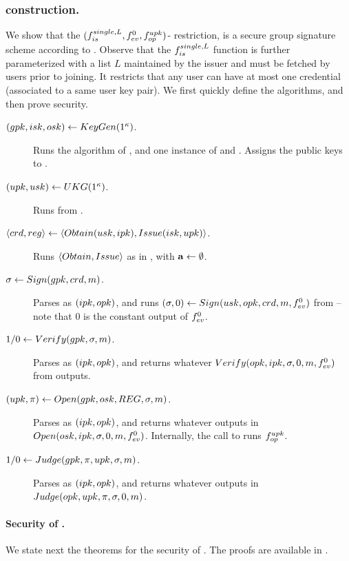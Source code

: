 \subsubsection{\CUASGS construction.} %
We show that the $(f_{is}^{single,L},f_{ev}^0,f_{op}^{upk})$-\CUASGen
restriction, is a secure group signature scheme according to \cite{bsz05}.
Observe that the $f_{is}^{single,L}$ function is further parameterized with
a list $L$ maintained by the issuer and must be fetched by users prior to
joining. It restricts that any user can have at most one credential (associated
to a same user key pair). We first quickly define the algorithms, and then
prove security.

\begin{description}
\item[$(gpk,isk,osk) \gets KeyGen(1^\kappa)$.] Runs the \Setup algorithm
  of \CUASGen, and one instance of \IKeyGen and \OKeyGen. Assigns the public
  keys to \gpk.
\item[$(upk,usk) \gets UKG(1^\kappa)$.] Runs \UKeyGen from \CUASGen.
\item[$\langle crd,reg \rangle \gets
  \langle Obtain(usk,ipk),Issue(isk,upk)\rangle$.] Runs $\langle Obtain,
  Issue\rangle$ as in \CUASGen, with $\mathbf{a} \gets \emptyset$.
\item[$\sigma \gets Sign(gpk,crd,m)$.] Parses \gpk as $(ipk,opk)$, and
  runs $(\sigma,0) \gets Sign(usk,opk,crd,m,f_{ev}^0)$ from \CUASGen --
  note that $0$ is the constant output of $f_{ev}^0$.
\item[$1/0 \gets Verify(gpk,\sigma,m)$.] Parses \gpk as $(ipk,opk)$, and
  returns whatever $Verify(opk,ipk,\sigma,0,m,f_{ev}^0)$ from \CUASGen
  outputs.
\item[$(\upk,\pi) \gets \Open(\gpk,\osk,\trans,\sig,\msg)$.] Parses \gpk as
  $(ipk,opk)$, and returns whatever \CUASGen outputs in $Open(osk,ipk,\sigma,
  0,m,f_{ev}^0)$. Internally, the call to \Open runs $f_{op}^{upk}$.
\item[$1/0 \gets Judge(gpk,\pi,upk,\sigma,m)$.] Parses \gpk as $(ipk,
  opk)$, and returns whatever \CUASGen outputs in $Judge(opk,upk,\pi,\sigma,
  0,m)$.
\end{description}

\paragraph{Security of \CUASGS.} %
We state next the theorems for the security of \CUASGS. The proofs are available
in .

